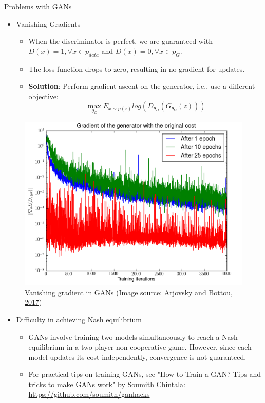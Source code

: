 \begin{frame}[allowframebreaks]{Problems with GANs}
\begin{itemize}
    \item Vanishing Gradients 
    \begin{itemize}
        \item When the discriminator is perfect, we are guaranteed with $D(x) = 1, \forall x \in p_{data}$ and $D(x) = 0, \forall x \in p_G$.
        \item The loss function drops to zero, resulting in no gradient for updates.
        \item \textbf{Solution}: Perform gradient ascent on the generator, i.e., use a different objective:
        $$\max_{\theta_G} E_{x \sim p(z)} log(D_{\theta_D}(G_{\theta_G}(z)))$$
    \end{itemize}
\end{itemize}

\framebreak

\begin{figure}
    \centering
    \includegraphics[height=0.8\textheight, width=\textwidth, keepaspectratio]{images/gan/gan_generator_gradient.png}
    \caption{Vanishing gradient in GANs (Image source: \href{https://arxiv.org/pdf/1701.04862.pdf}{Arjovsky and Bottou, 2017})}
\end{figure}

\framebreak

\begin{itemize}
    \item Difficulty in achieving Nash equilibrium
    \begin{itemize}
        \item GANs involve training two models simultaneously to reach a Nash equilibrium in a two-player non-cooperative game. However, since each model updates its cost independently, convergence is not guaranteed.
        \item For practical tips on training GANs, see "How to Train a GAN? Tips and tricks to make GANs work" by Soumith Chintala: \href{https://github.com/soumith/ganhacks}{https://github.com/soumith/ganhacks}
    \end{itemize}
\end{itemize}


\end{frame}

